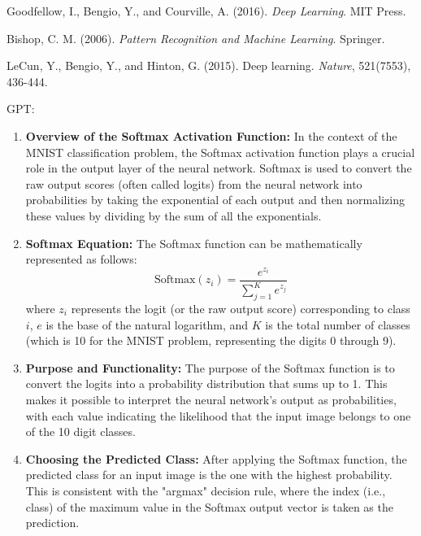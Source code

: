 \begin{thebibliography}{9}
  Goodfellow, I., Bengio, Y., and Courville, A. (2016).
  \textit{Deep Learning}.
  MIT Press.

  Bishop, C. M. (2006).
  \textit{Pattern Recognition and Machine Learning}.
  Springer.

  LeCun, Y., Bengio, Y., and Hinton, G. (2015).
  Deep learning.
  \textit{Nature}, 521(7553), 436-444.
\end{thebibliography}

GPT:

\begin{enumerate}
    \item \textbf{Overview of the Softmax Activation Function:}
    In the context of the MNIST classification problem, the Softmax activation function plays a crucial role in the output layer of the neural network. Softmax is used to convert the raw output scores (often called logits) from the neural network into probabilities by taking the exponential of each output and then normalizing these values by dividing by the sum of all the exponentials.

    \item \textbf{Softmax Equation:}
    The Softmax function can be mathematically represented as follows:
    \[
    \text{Softmax}(z_i) = \frac{e^{z_i}}{\sum_{j=1}^{K} e^{z_j}}
    \]
    where $z_i$ represents the logit (or the raw output score) corresponding to class $i$, $e$ is the base of the natural logarithm, and $K$ is the total number of classes (which is 10 for the MNIST problem, representing the digits 0 through 9).

    \item \textbf{Purpose and Functionality:}
    The purpose of the Softmax function is to convert the logits into a probability distribution that sums up to 1. This makes it possible to interpret the neural network's output as probabilities, with each value indicating the likelihood that the input image belongs to one of the 10 digit classes.

    \item \textbf{Choosing the Predicted Class:}
    After applying the Softmax function, the predicted class for an input image is the one with the highest probability. This is consistent with the "argmax" decision rule, where the index (i.e., class) of the maximum value in the Softmax output vector is taken as the prediction.


\end{enumerate}
